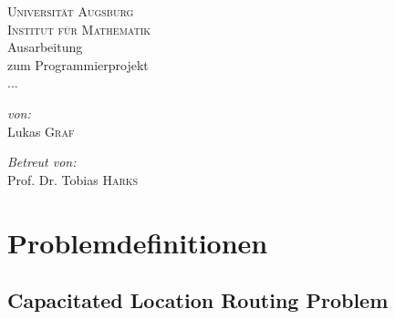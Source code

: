 \documentclass[a4paper,ngerman,12pt,bibtotoc]{scrartcl}
\theoremstyle{definition}
\theoremstyle{plain}
\theoremstyle{remark}
\begin{document}
	\author{Lukas Graf}
	\date{Letzte Aktualisierung: \today}
	
	\thispagestyle{empty}
	
	
	\begin{titlepage}\center
	\textsc{\LARGE Universität Augsburg}\\[1.5cm]
	
	\textsc{\Large Institut für Mathematik}\\[2.5cm]
	
	{\Large Ausarbeitung \\[1cm]}
	zum Programmierprojekt\\[1.5cm]
	{\huge ...}
		
	
	\vfill
	
	\begin{minipage}{0.4\textwidth}
		\begin{flushleft} \large
			\emph{von:}\\
			Lukas \textsc{Graf}
		\end{flushleft}
	\end{minipage}
	\begin{minipage}{0.4\textwidth}
		\begin{flushright} \large
			\emph{Betreut von:} \\
			Prof. Dr. Tobias \textsc{Harks}
		\end{flushright}
	\end{minipage}
	
	\end{titlepage}


	

	\section{Problemdefinitionen}
	
	\subsection{Capacitated Location Routing Problem}
	
\end{document}

